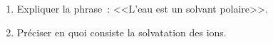 \begin{enumerate}
    \item Expliquer la phrase~: <<L'eau est un solvant polaire>>.
    \item Préciser en quoi consiste la solvatation des ions.
\end{enumerate}

